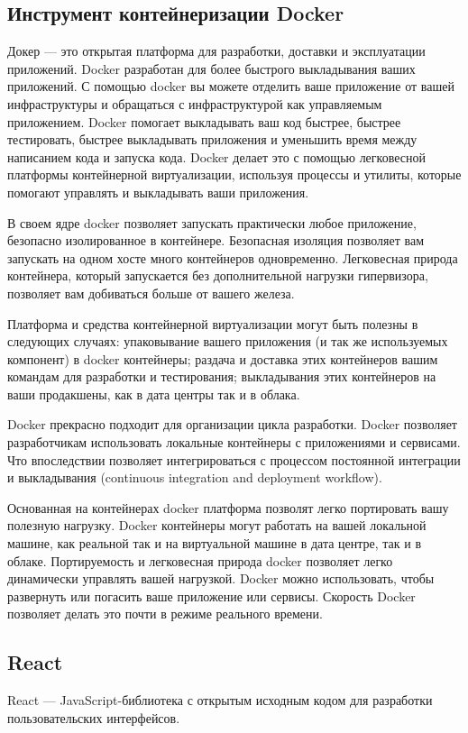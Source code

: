 \subsection{Инструмент контейнеризации Docker}
Докер — это открытая платформа для разработки, доставки и эксплуатации приложений.
Docker разработан для более быстрого выкладывания ваших приложений.
С помощью docker вы можете отделить ваше приложение от вашей инфраструктуры и обращаться с инфраструктурой как управляемым приложением.
Docker помогает выкладывать ваш код быстрее, быстрее тестировать, быстрее выкладывать приложения и уменьшить время между написанием кода и запуска кода.
Docker делает это с помощью легковесной платформы контейнерной виртуализации, используя процессы и утилиты, которые помогают управлять и выкладывать ваши приложения.

В своем ядре docker позволяет запускать практически любое приложение, безопасно изолированное в контейнере.
Безопасная изоляция позволяет вам запускать на одном хосте много контейнеров одновременно.
Легковесная природа контейнера, который запускается без дополнительной нагрузки гипервизора, позволяет вам добиваться больше от вашего железа.

Платформа и средства контейнерной виртуализации могут быть полезны в следующих случаях: упаковывание вашего приложения (и так же используемых компонент) в docker контейнеры; раздача и доставка этих контейнеров вашим командам для разработки и тестирования; выкладывания этих контейнеров на ваши продакшены, как в дата центры так и в облака.

Docker прекрасно подходит для организации цикла разработки.
Docker позволяет разработчикам использовать локальные контейнеры с приложениями и сервисами. Что впоследствии позволяет интегрироваться с процессом постоянной интеграции и выкладывания (continuous integration and deployment workflow).

Основанная на контейнерах docker платформа позволят легко портировать вашу полезную нагрузку.
Docker контейнеры могут работать на вашей локальной машине, как реальной так и на виртуальной машине в дата центре, так и в облаке.
Портируемость и легковесная природа docker позволяет легко динамически управлять вашей нагрузкой.
Docker можно использовать, чтобы развернуть или погасить ваше приложение или сервисы. Скорость Docker позволяет делать это почти в режиме реального времени.

\subsection{React}
React — JavaScript-библиотека с открытым исходным кодом для разработки пользовательских интерфейсов.

